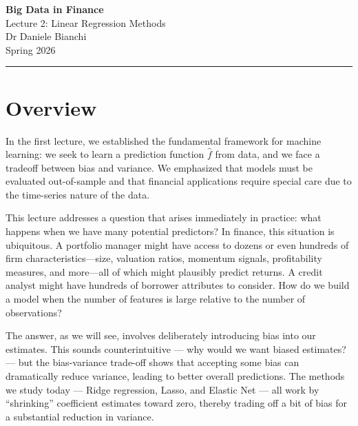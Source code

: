 \documentclass[11pt,a4paper]{article}
\begin{document}
\begin{center}
    {\LARGE\bfseries\textcolor{ThemeBlue}{Big Data in Finance}}\\[0.5em]
    {\Large Lecture 2: Linear Regression Methods}\\[1em]
    {\large Dr Daniele Bianchi}\\[0.5em]
    {\normalsize Spring 2026}
\end{center}

\vspace{1em}
\hrule
\vspace{1em}

\tableofcontents

\vspace{2cm}

\section*{Overview}

In the first lecture, we established the fundamental framework for machine learning: we seek to learn a prediction function $\widehat{f}$ from data, and we face a tradeoff between bias and variance. We emphasized that models must be evaluated out-of-sample and that financial applications require special care due to the time-series nature of the data.

This lecture addresses a question that arises immediately in practice: what happens when we have many potential predictors? In finance, this situation is ubiquitous. A portfolio manager might have access to dozens or even hundreds of firm characteristics---size, valuation ratios, momentum signals, profitability measures, and more---all of which might plausibly predict returns. A credit analyst might have hundreds of borrower attributes to consider. How do we build a model when the number of features is large relative to the number of observations?

The answer, as we will see, involves deliberately introducing bias into our estimates. This sounds counterintuitive — why would we want biased estimates? — but the bias-variance trade-off shows that accepting some bias can dramatically reduce variance, leading to better overall predictions. The methods we study today — Ridge regression, Lasso, and Elastic Net — all work by ``shrinking'' coefficient estimates toward zero, thereby trading off a bit of bias for a substantial reduction in variance.
\end{document}

